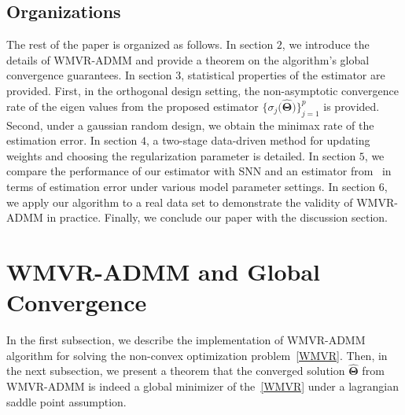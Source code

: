\documentclass[alpha-refs]{wiley-article}
\begin{document}
\subsection{Organizations}
The rest of the paper is organized as follows.
In section $2$, we introduce the details of WMVR-ADMM and provide a theorem on the algorithm's global convergence guarantees.
In section $3$, statistical properties of the estimator are provided.  
First, in the orthogonal design setting, the non-asymptotic convergence rate of the eigen values from the proposed estimator  $\{\sigma_{j}\big(\widehat{\boldsymbol{\Theta}}\big)\}_{j=1}^{p}$ is provided. 
Second, under a gaussian random design, we obtain the minimax rate of the estimation error.
In section $4$, a two-stage data-driven method for updating weights and choosing the regularization parameter is detailed.
In section $5$, we compare the performance of our estimator with SNN and an estimator from~\citet{chen2013reduced} in terms of estimation error under various model parameter settings.
In section $6$, we apply our algorithm to a real data set to demonstrate the validity of WMVR-ADMM in practice.
Finally, we conclude our paper with the discussion section. 

\section{WMVR-ADMM and Global Convergence}
In the first subsection, we describe the implementation of WMVR-ADMM algorithm for solving the non-convex optimization  problem~\eqref{WMVR}.
Then, in the next subsection, we present a theorem that the converged solution $\widehat{\boldsymbol{\Theta}}$ from WMVR-ADMM is indeed a global minimizer of the~\eqref{WMVR} under a lagrangian saddle point assumption.
\end{document}
